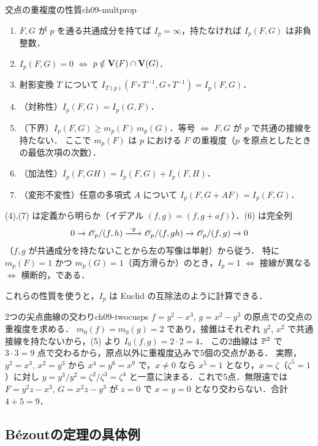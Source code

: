 \begin{myprop}{交点の重複度の性質}{ch09-multprop}
\begin{enumerate}
  \item $F,G$ が $p$ を通る共通成分を持てば $I_p=\infty$，持たなければ $I_p(F,G)$ は非負整数．
  \item $I_p(F,G)=0$ $\iff$ $p\notin\mathbf{V}(F)\cap\mathbf{V}(G)$．
  \item 射影変換 $T$ について $I_{T(p)}(F\circ T^{-1},G\circ T^{-1})=I_p(F,G)$．
  \item（対称性）$I_p(F,G)=I_p(G,F)$．
  \item（下界）$I_p(F,G)\ge m_p(F)\,m_p(G)$．等号 $\iff$ $F,G$ が $p$ で共通の接線を持たない．
  ここで $m_p(F)$ は $p$ における $F$ の重複度（$p$ を原点としたときの最低次項の次数）．
  \item（加法性）$I_p(F,GH)=I_p(F,G)+I_p(F,H)$．
  \item（変形不変性）任意の多項式 $A$ について $I_p(F,G+AF)=I_p(F,G)$．
\end{enumerate}
\end{myprop}

(4),(7) は定義から明らか（イデアル $(f,g)=(f,g+af)$）．(6) は完全列
\[
  0\to\OO_p/(f,h)\xrightarrow{\ \cdot g\ }\OO_p/(f,gh)\to\OO_p/(f,g)\to0
\]
（$f,g$ が共通成分を持たないことから左の写像は単射）から従う．
特に $m_p(F)=1$ かつ $m_p(G)=1$（両方滑らか）のとき，$I_p=1$ $\iff$ 接線が異なる $\iff$ 横断的，である．

これらの性質を使うと，$I_p$ は Euclid の互除法のように計算できる．

\begin{myex}{2つの尖点曲線の交わり}{ch09-twocusps}
$f=y^2-x^3$, $g=x^2-y^3$ の原点での交点の重複度を求める．
$m_0(f)=m_0(g)=2$ であり，接錐はそれぞれ $y^2$, $x^2$ で共通接線を持たないから，(5) より $I_0(f,g)=2\cdot2=4$．
この2曲線は $\mathbb{P}^2$ で $3\cdot3=9$ 点で交わるから，原点以外に重複度込みで5個の交点がある．
実際，$y^2=x^3$, $x^2=y^3$ から $x^4=y^6=x^9$ で，$x\neq0$ なら $x^5=1$ となり，$x=\zeta$（$\zeta^5=1$）に対し $y=y^3/y^2=\zeta^2/\zeta^3=\zeta^4$ と一意に決まる．これで5点．無限遠では $F=y^2z-x^3$, $G=x^2z-y^3$ が $z=0$ で $x=y=0$ となり交わらない．合計 $4+5=9$．
\end{myex}

\subsection{B\'ezoutの定理の具体例}

